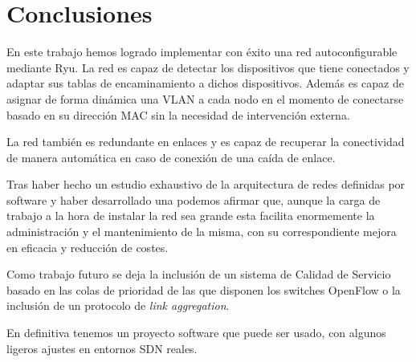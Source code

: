 \chapter{Conclusiones}

En este trabajo hemos logrado implementar con éxito una red autoconfigurable mediante Ryu. La red es capaz de detectar los dispositivos que tiene conectados y adaptar sus tablas de encaminamiento a dichos dispositivos. Además es capaz de asignar de forma dinámica una VLAN a cada nodo en el momento de conectarse basado en su dirección MAC sin la necesidad de intervención externa.

La red también es redundante en enlaces y es capaz de recuperar la conectividad de manera automática en caso de conexión de una caída de enlace.

Tras haber hecho un estudio exhaustivo de la arquitectura de redes definidas por software y haber desarrollado una podemos afirmar que, aunque la carga de trabajo a la hora de instalar la red sea grande esta facilita enormemente la administración y el mantenimiento de la misma, con su correspondiente mejora en eficacia y reducción de costes.

Como trabajo futuro se deja la inclusión de un sistema de Calidad de Servicio basado en las colas de prioridad de las que disponen los switches OpenFlow o la inclusión de un protocolo de \textit{link aggregation}.

En definitiva tenemos un proyecto software que puede ser usado, con algunos ligeros ajustes en entornos SDN reales.
